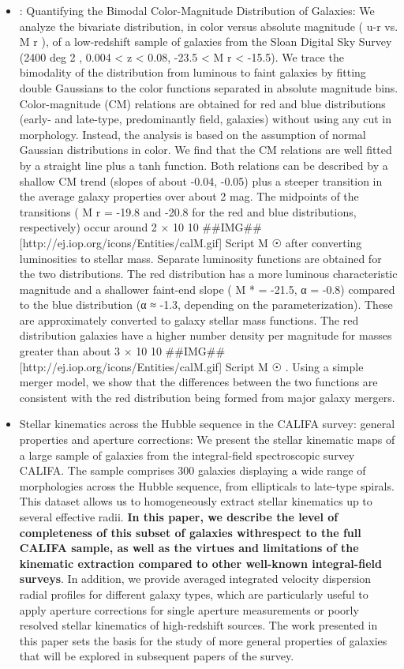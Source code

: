\documentclass[ceqn,usenatbib,onecolumn]{mnras}
\begin{document}
\begin{itemize}
    \item \citet{0004-637X-600-2-681}: Quantifying the Bimodal Color-Magnitude Distribution of Galaxies: We analyze the bivariate distribution, in color versus absolute magnitude ( u-r vs. M r ), of a low-redshift sample of galaxies from the Sloan Digital Sky Survey (2400 deg 2 , 0.004 < z < 0.08, -23.5 < M r < -15.5). We trace the bimodality of the distribution from luminous to faint galaxies by fitting double Gaussians to the color functions separated in absolute magnitude bins. Color-magnitude (CM) relations are obtained for red and blue distributions (early- and late-type, predominantly field, galaxies) without using any cut in morphology. Instead, the analysis is based on the assumption of normal Gaussian distributions in color. We find that the CM relations are well fitted by a straight line plus a tanh function. Both relations can be described by a shallow CM trend (slopes of about -0.04, -0.05) plus a steeper transition in the average galaxy properties over about 2 mag. The midpoints of the transitions ( M r = -19.8 and -20.8 for the red and blue distributions, respectively) occur around 2 × 10 10 ##IMG## [http://ej.iop.org/icons/Entities/calM.gif] {Script M} ☉ after converting luminosities to stellar mass. Separate luminosity functions are obtained for the two distributions. The red distribution has a more luminous characteristic magnitude and a shallower faint-end slope ( M * = -21.5, α = -0.8) compared to the blue distribution (α ≈ -1.3, depending on the parameterization). These are approximately converted to galaxy stellar mass functions. The red distribution galaxies have a higher number density per magnitude for masses greater than about 3 × 10 10 ##IMG## [http://ej.iop.org/icons/Entities/calM.gif] {Script M} ☉ . Using a simple merger model, we show that the differences between the two functions are consistent with the red distribution being formed from major galaxy mergers.
    \item \citet{2017A&A...597A..48F} Stellar kinematics across the Hubble sequence in the CALIFA survey: general properties and aperture corrections: We present the stellar kinematic maps of a large sample of galaxies from the integral-field spectroscopic survey CALIFA. The sample comprises 300 galaxies displaying a wide range of morphologies across the Hubble sequence, from ellipticals to late-type spirals. This dataset allows us to homogeneously extract stellar kinematics up to several effective radii. \textbf{In this paper, we describe the level of completeness of this subset of galaxies withrespect to the full CALIFA sample, as well as the virtues and limitations of the kinematic extraction compared to other well-known integral-field surveys}. In addition, we provide averaged integrated velocity dispersion radial profiles for different galaxy types, which are particularly useful to apply aperture corrections for single aperture measurements or poorly resolved stellar kinematics of high-redshift sources. The work presented in this paper sets the basis for the study of more general properties of galaxies that will be explored in subsequent papers of the survey.

\end{itemize}
\end{document}
